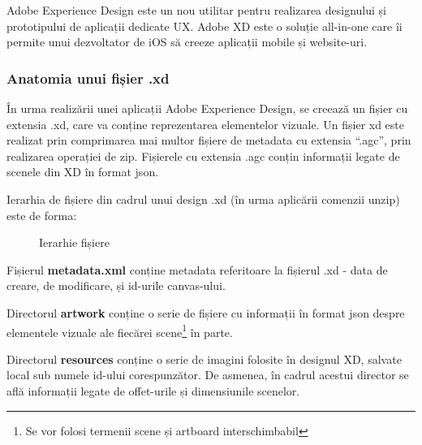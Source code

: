 Adobe Experience Design este un nou utilitar pentru realizarea designului și prototipului de aplicații dedicate UX. Adobe XD este o soluție all-in-one care îi permite unui dezvoltator de iOS să creeze aplicații mobile și website-uri. 

\subsubsection{Anatomia unui fișier .xd}

În urma realizării unei aplicații Adobe Experience Design, se creează un fișier cu extensia .xd, care va conține reprezentarea elementelor vizuale. 
Un fișier xd este realizat prin comprimarea mai multor fișiere de metadata cu extensia “.agc”, prin realizarea operației de zip. Fișierele cu extensia .agc conțin informații legate de scenele din XD în format json.

Ierarhia de fișiere din cadrul unui design .xd (în urma aplicării comenzii unzip) este de forma:

\begin{figure}[!htbp]
\caption{Ierarhie fișiere} \label{fig:ierarhie}
\end{figure}

Fișierul \textbf{metadata.xml} conține metadata referitoare la fișierul .xd - data de creare, de modificare, și id-urile canvas-ului.

Directorul \textbf{artwork} conține o serie de fișiere cu informații în format json despre elementele vizuale ale fiecărei scene\footnote{Se vor folosi termenii scene și artboard interschimbabil} în parte. 

Directorul  \textbf{resources} conține o serie de imagini folosite în designul XD, salvate local sub numele id-ului corespunzător. De asmenea, în cadrul acestui director se află informații legate de offet-urile și dimensiunile scenelor.

